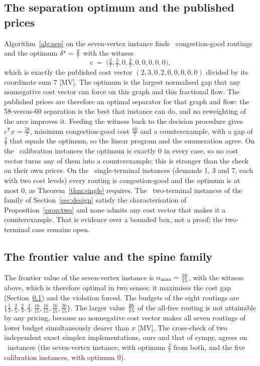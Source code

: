 \documentclass[11pt]{article}
\theoremstyle{remark}
\begin{document}
\subsection{The separation optimum and the published prices}
\label{sec:sepresult}

Algorithm~\ref{alg:sep} on the seven-vertex instance finds \nsepgood\ congestion-good routings and the optimum $\delta^\star=\tfrac{2}{7}$ with the witness
\[
c\;=\;\bigl(\tfrac27,\tfrac37,0,\tfrac27,0,0,0,0,0\bigr),
\]
which is exactly the published cost vector $(2,3,0,2,0,0,0,0,0)$ divided by its coordinate sum $7$ [MV]. The optimum is the largest normalised gap that any nonnegative cost vector can force on this graph and this fractional flow. The published prices are therefore an optimal separator for that graph and flow: the 58-versus-60 separation is the best that instance can do, and no reweighting of the arcs
improves it. Feeding the witness back to the decision procedure gives $c^{\mathsf T}x=\tfrac{58}{7}$, minimum congestion-good cost $\tfrac{60}{7}$ and a counterexample, with a gap of $\tfrac27$ that equals the optimum, so the linear program and the enumeration agree. On the \nvalsets\ calibration instances the optimum is exactly $0$ in every case,
so no cost vector turns any of them into a counterexample; this is stronger than the check on their own prices. On the \nsingle\ single-terminal instances (demands 1, 3 and 7, each with two cost levels) every routing is congestion-good and the optimum is at most $0$, as Theorem~\ref{thm:single} requires. The \ntwoterm\ two-terminal instances
of the family of Section~\ref{sec:design} satisfy the characterisation of Proposition~\ref{prop:two} and none admits any cost vector that makes it a counterexample. That is evidence over a bounded box, not a proof; the two-terminal case remains open.

\subsection{The frontier value and the spine family}
\label{sec:family}

The frontier value of the seven-vertex instance is $\alpha_{\max}=\tfrac{16}{15}$, with the witness above, which is therefore optimal in two senses: it maximises the cost gap (Section~\ref{sec:sepresult}) and the violation forced. The budgets of the eight routings are $\{\tfrac13,\tfrac25,\tfrac23,\tfrac23,\tfrac{16}{15},\tfrac{16}{15},\tfrac{16}{15},\tfrac{26}{15}\}$. The larger value $\tfrac{26}{15}$ of the all-free routing is not attainable by any pricing,
because no nonnegative cost vector makes all seven routings of lower budget simultaneously dearer than $x$ [MV]. The cross-check of two independent exact simplex implementations, ours and that of sympy, agrees on \nxcheck\ instances (the seven-vertex instance, with optimum $\tfrac27$ from both, and the five calibration instances, with optimum $0$).
\end{document}
